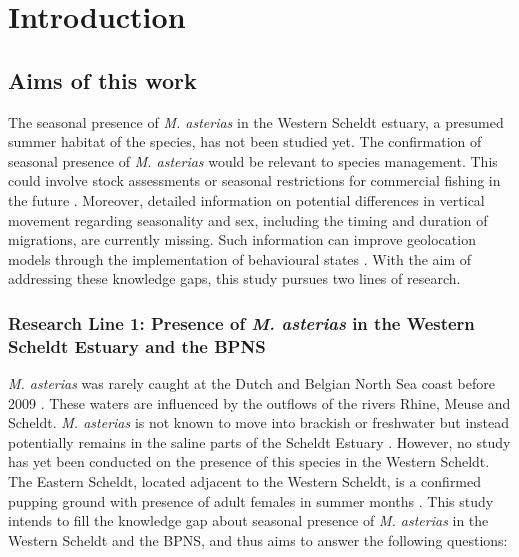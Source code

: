 \documentclass[
  authoryear,
  review,
  3p]{elsarticle}
\renewcommand*\contentsname{Table of contents}
\newcommand\contentsname{Table of contents}
\begin{document}
\renewcommand*\contentsname{Table of contents}
{
\hypersetup{linkcolor=}
\setcounter{tocdepth}{3}
\tableofcontents
}
\hypertarget{introduction}{%
\section{Introduction}\label{introduction}}

\hypertarget{sec-intro-aims}{%
\subsection{Aims of this work}\label{sec-intro-aims}}

The seasonal presence of \emph{M. asterias} in the Western Scheldt
estuary, a presumed summer habitat of the species, has not been studied
yet. The confirmation of seasonal presence of \emph{M. asterias} would
be relevant to species management. This could involve stock assessments
or seasonal restrictions for commercial fishing in the future
\citep{benot_2003}. Moreover, detailed information on potential
differences in vertical movement regarding seasonality and sex,
including the timing and duration of migrations, are currently missing.
Such information can improve geolocation models through the
implementation of behavioural states \citep{pedersen_2008}. With the aim
of addressing these knowledge gaps, this study pursues two lines of
research.

\hypertarget{research-line-1-presence-of-m.-asterias-in-the-western-scheldt-estuary-and-the-bpns}{%
\subsubsection*{\texorpdfstring{Research Line 1: Presence of \emph{M.
asterias} in the Western Scheldt Estuary and the
BPNS}{Research Line 1: Presence of M. asterias in the Western Scheldt Estuary and the BPNS}}\label{research-line-1-presence-of-m.-asterias-in-the-western-scheldt-estuary-and-the-bpns}}

\emph{M. asterias} was rarely caught at the Dutch and Belgian North Sea
coast before 2009 \citep{breve_2016}. These waters are influenced by the
outflows of the rivers Rhine, Meuse and Scheldt. \emph{M. asterias} is
not known to move into brackish or freshwater but instead potentially
remains in the saline parts of the Scheldt Estuary
\citep{dewysiecki_2017}. However, no study has yet been conducted on the
presence of this species in the Western Scheldt. The Eastern Scheldt,
located adjacent to the Western Scheldt, is a confirmed pupping ground
with presence of adult females in summer months
\citep{breve_2016, breve_2020}. This study intends to fill the knowledge
gap about seasonal presence of \emph{M. asterias} in the Western Scheldt
and the BPNS, and thus aims to answer the following questions:
\end{document}
